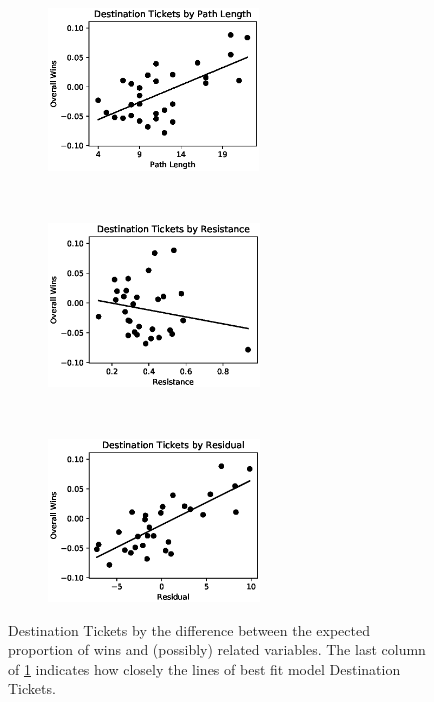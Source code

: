 \begin{figure}[H]
    \centering
    \begin{subfigure}[t]{0.33\textwidth}
        \centering
        \includegraphics[height=1.7in]{figures/correlation0}
    \end{subfigure}%
    ~ 
    \begin{subfigure}[t]{0.33\textwidth}
        \centering
        \includegraphics[height=1.7in]{figures/correlation1}
    \end{subfigure}%
    ~ 
    \begin{subfigure}[t]{0.33\textwidth}
        \centering
        \includegraphics[height=1.7in]{figures/correlation2}
    \end{subfigure}%
    \caption{Destination Tickets by the
    difference between the expected proportion of wins
    and (possibly) related variables.
    The last column of \cref{fig:correlation_figures}
    indicates how closely the lines of best fit
    model Destination Tickets.}
    \label{fig:correlation_figures}
\end{figure}
